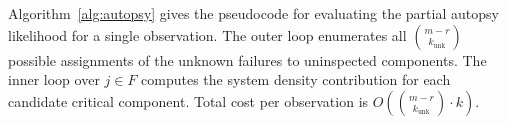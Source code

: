 \documentclass[12pt]{article}
\begin{document}
Algorithm~\ref{alg:autopsy} gives the pseudocode for evaluating the
partial autopsy likelihood for a single observation.  The outer loop
enumerates all $\binom{m-r}{k_{\text{unk}}}$ possible assignments of the
unknown failures to uninspected components.  The inner loop over $j \in F$
computes the system density contribution for each candidate critical
component.  Total cost per observation is
$O(\binom{m-r}{k_{\text{unk}}} \cdot k)$.
\end{document}

